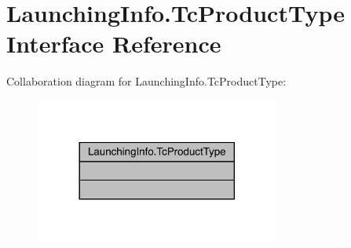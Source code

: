 \hypertarget{interfacecom_1_1toast_1_1android_1_1gamebase_1_1launching_1_1data_1_1_launching_info_1_1_tc_product_type}{}\section{Launching\+Info.\+Tc\+Product\+Type Interface Reference}
\label{interfacecom_1_1toast_1_1android_1_1gamebase_1_1launching_1_1data_1_1_launching_info_1_1_tc_product_type}


Collaboration diagram for Launching\+Info.\+Tc\+Product\+Type\+:
\nopagebreak
\begin{figure}[H]
\begin{center}
\leavevmode
\includegraphics[width=228pt]{interfacecom_1_1toast_1_1android_1_1gamebase_1_1launching_1_1data_1_1_launching_info_1_1_tc_product_type__coll__graph}
\end{center}
\end{figure}
